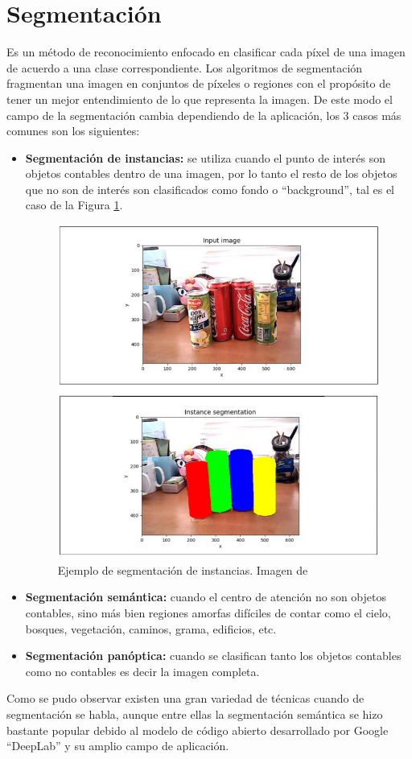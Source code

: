 \section{Segmentación}
Es un método de reconocimiento enfocado en clasificar cada píxel de una imagen de acuerdo a una clase correspondiente. Los algoritmos de segmentación fragmentan una imagen en conjuntos de píxeles o regiones con el propósito de tener un mejor entendimiento de lo que representa la imagen. De este modo el campo de la segmentación cambia dependiendo de la aplicación, los 3 casos más comunes son los siguientes:
\begin{itemize}
    \item \textbf{Segmentación de instancias:} se utiliza cuando el punto de interés son objetos contables dentro de una imagen, por lo tanto el resto de los objetos que no son de interés son clasificados como fondo o ``background'', tal es el caso de la Figura \ref{instance_segmentation}.
    \begin{figure}[H]
        \centering
        \includegraphics[scale=0.5]{Recursos/instance_segmentation.png}
        \caption{Ejemplo de segmentación de instancias. Imagen de \cite{Atienza2018}}
        \label{instance_segmentation}
    \end{figure}
    \item \textbf{Segmentación semántica:} cuando el centro de atención no son objetos contables, sino más bien regiones amorfas difíciles de contar como el cielo, bosques, vegetación, caminos, grama, edificios, etc.
    \item \textbf{Segmentación panóptica:} cuando se clasifican tanto los objetos contables como no contables es decir la imagen completa.
\end{itemize}
Como se pudo observar existen una gran variedad de técnicas cuando de segmentación se habla, aunque entre ellas la segmentación semántica se hizo bastante popular debido al modelo de código abierto desarrollado por Google ``DeepLab'' y su amplio campo de aplicación.
